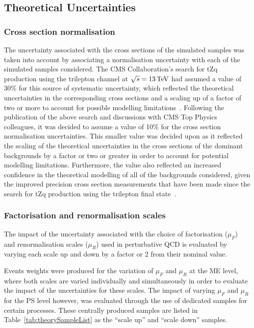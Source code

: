 \newpage

\subsection{Theoretical Uncertainties}\label{sec:theorySysts}
\subsubsection{Cross section normalisation}
The uncertainty associated with the cross sections of the simulated samples was taken into account by associating a normalisation uncertainty with each of the simulated samples considered.
The CMS Collaboration's search for tZq production using the trilepton channel at $\sqrt{s} = 13\,\text{Te\hspace{-.08em}V}$ had assumed a value of 30\% for this source of systematic uncertainty, which reflected the theoretical uncertainties in the corresponding cross sections and a scaling up of a factor of two or more to account for possible modelling limitations~\cite{Sirunyan:2017nbr}.
Following the publication of the above search and discussions with CMS Top Physics colleagues, it was decided to assume a value of 10\% for the cross section normalisation uncertainties.
This smaller value was decided upon as it reflected the scaling of the theoretical uncertainties in the cross sections of the dominant backgrounds by a factor or two or greater in order to account for potential modelling limitations.
Furthermore, the value also reflected an increased confidence in the theoretical modelling of all of the backgrounds considered, given the improved precision cross section measurements that have been made since the search for tZq production using the trilepton final state~\cite{combineNick,crossSectionSystematics}. 


\subsubsection{Factorisation and renormalisation scales}
The impact of the uncertainty associated with the choice of factorisation ($\mu_{F}$) and renormalisation scales ($\mu_{R}$) used in perturbative QCD is evaluated by varying each scale up and down by a factor or 2 from their nominal value.

Events weights were produced for the variation of $\mu_{F}$ and $\mu_{R}$ at the ME level, where both scales are varied individually and simultaneously in order to evaluate the impact of the uncertainties for these scales.
The impact of varying $\mu_{F}$ and $\mu_{R}$ for the PS level however, was evaluated through the use of dedicated samples for certain processes.
These centrally produced samples are listed in Table~\ref{tab:theorySampleList} as the ``scale up'' and ``scale down'' samples. 

